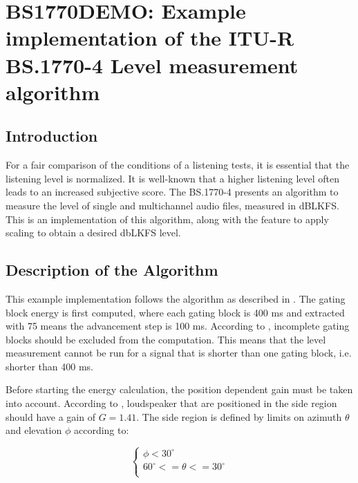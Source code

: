 
\chapter{BS1770DEMO: Example implementation of the ITU-R BS.1770-4 Level measurement algorithm}

\section{Introduction}

For a fair comparison of the conditions of a listening tests, it is essential
that the listening level is normalized. It is well-known that a higher listening
level often leads to an increased subjective score. The BS.1770-4 presents an algorithm
to measure the level of single and multichannel audio files, measured in dBLKFS. 
This is an implementation of this algorithm, along with the feature to apply scaling 
to obtain a desired dbLKFS level.

\section{Description of the Algorithm}

This example implementation follows the algorithm as described in \cite{BS1770}. The gating block
energy is first computed, where each gating block is 400 ms and extracted with 75%
means the advancement step is 100 ms. According to \cite{BS1770}, incomplete gating blocks should
be excluded from the computation. This means that the level measurement cannot be run for a signal
that is shorter than one gating block, i.e. shorter than 400 ms.

Before starting the energy calculation, the position dependent gain must be taken into account. 
According to \cite{BS1770}, loudspeaker that are positioned in the side region should have a gain
of $G=1.41$. The side region is defined by limits on azimuth $\theta$ and elevation $\phi$ according to:

  \[
    \left\{
       \begin{array}{ll}
         \phi < 30 ^{\circ} \\
         60 ^{\circ} <= \theta <= 30 ^{\circ} \\
       \end{array}
     \right.
  \]  

